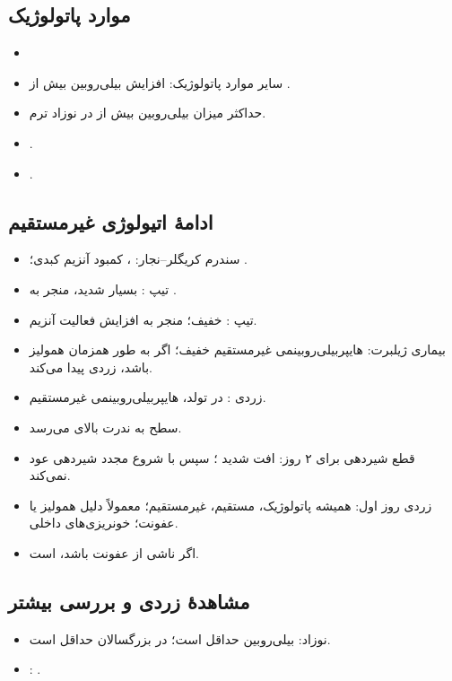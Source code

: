 \documentclass[12pt,a4paper]{article}
\begin{document}
\subsection*{موارد پاتولوژیک}
\begin{itemize}
\item {}
\item سایر موارد پاتولوژیک: افزایش بیلی‌روبین بیش از .
\item حداکثر میزان بیلی‌روبین بیش از  در نوزاد ترم.
\item {}.
\item {}.
\end{itemize}
\subsection*{ادامهٔ اتیولوژی غیرمستقیم}
\begin{itemize}
\item[۲)] سندرم کریگلر–نجار: ، کمبود آنزیم کبدی؛
.
\item تیپ : بسیار شدید، منجر به .
\item تیپ : خفیف؛  منجر به افزایش فعالیت آنزیم.
\item[۳)] بیماری ژیلبرت: هایپربیلی‌روبینمی غیرمستقیم خفیف؛
اگر به طور همزمان همولیز باشد، زردی پیدا می‌کند.
\item[۴)] زردی : در  تولد، هایپربیلی‌روبینمی غیرمستقیم.
\item سطح  به ندرت بالای  می‌رسد.
\item قطع شیردهی برای ۲ روز: افت شدید ؛ سپس با شروع مجدد شیردهی عود نمی‌کند.
\item[۵)] زردی روز اول: همیشه پاتولوژیک، مستقیم، غیرمستقیم؛
معمولاً دلیل همولیز یا عفونت؛ خونریزی‌های داخلی.
\item اگر ناشی از عفونت باشد،  است.
\end{itemize}
\subsection*{مشاهدهٔ زردی و بررسی بیشتر}
\begin{itemize}
\item نوزاد: بیلی‌روبین حداقل  است؛ در بزرگسالان حداقل  است.
\item[\AHmath{\ast}] : .
\end{itemize}
\end{document}
